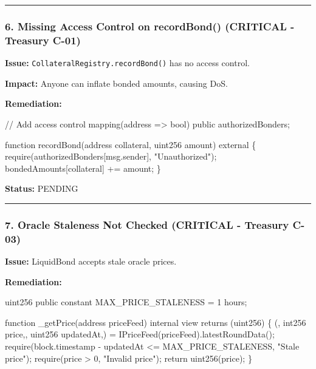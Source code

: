 \documentclass[
]{article}
\newenvironment{Shaded}{}{}
\newcommand{\NormalTok}[1]{#1}
\begin{document}
\begin{center}\rule{0.5\linewidth}{0.5pt}\end{center}

\subsubsection{6. Missing Access Control on recordBond() (CRITICAL -
Treasury
C-01)}\label{6-missing-access-control-on-recordbond-critical---treasury-c-01}

\textbf{Issue:} \texttt{CollateralRegistry.recordBond()} has no access
control.

\textbf{Impact:} Anyone can inflate bonded amounts, causing DoS.

\textbf{Remediation:}

\begin{Shaded}
\begin{Highlighting}[]
\NormalTok{// Add access control}
\NormalTok{mapping(address =\textgreater{} bool) public authorizedBonders;}

\NormalTok{function recordBond(address collateral, uint256 amount) external \{}
\NormalTok{    require(authorizedBonders[msg.sender], "Unauthorized");}
\NormalTok{    bondedAmounts[collateral] += amount;}
\NormalTok{\}}
\end{Highlighting}
\end{Shaded}

\textbf{Status:} PENDING

\begin{center}\rule{0.5\linewidth}{0.5pt}\end{center}

\subsubsection{7. Oracle Staleness Not Checked (CRITICAL - Treasury
C-03)}\label{7-oracle-staleness-not-checked-critical---treasury-c-03}

\textbf{Issue:} LiquidBond accepts stale oracle prices.

\textbf{Remediation:}

\begin{Shaded}
\begin{Highlighting}[]
\NormalTok{uint256 public constant MAX\_PRICE\_STALENESS = 1 hours;}

\NormalTok{function \_getPrice(address priceFeed) internal view returns (uint256) \{}
\NormalTok{    (, int256 price,, uint256 updatedAt,) = IPriceFeed(priceFeed).latestRoundData();}
\NormalTok{    require(block.timestamp {-} updatedAt \textless{}= MAX\_PRICE\_STALENESS, "Stale price");}
\NormalTok{    require(price \textgreater{} 0, "Invalid price");}
\NormalTok{    return uint256(price);}
\NormalTok{\}}
\end{Highlighting}
\end{Shaded}
\end{document}
